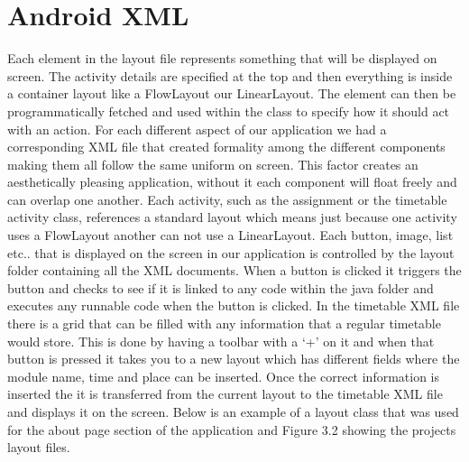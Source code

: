 \section{Android XML}
Each element in the layout file represents something that will be displayed on screen. The activity details are specified at the top and then everything is inside a container layout like a FlowLayout our LinearLayout. The element can then be programmatically fetched and used within the class to specify how it should act with an action. For each different aspect of our application we had a corresponding XML file that created formality among the different components making them all follow the same uniform on screen. This factor creates an aesthetically pleasing application, without it each component will float freely and can overlap one another. Each activity, such as the assignment or the timetable activity class, references a standard layout which means just because one activity uses a FlowLayout another can not use a LinearLayout. Each button, image, list etc.. that is displayed on the screen in our application is controlled by the layout folder containing all the XML documents. When a button is clicked it triggers the button and checks to see if it is linked to any code within the java folder and executes any runnable code when the button is clicked. In the timetable XML file there is a grid that can be filled with any information that a regular timetable would store. This is done by having a toolbar with a ‘+’ on it and when that button is pressed it takes you to a new layout which has different fields where the module name, time and place can be inserted. Once the correct information is inserted the it is transferred from the current layout to the timetable XML file and displays it on the screen. Below is an example of a layout class that was used for the about page section of the application and Figure 3.2 showing the projects layout files.
 \pagebreak
